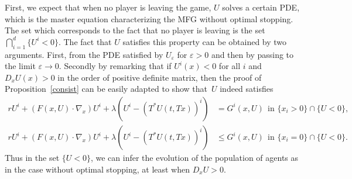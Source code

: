 \documentclass[JEP,XML,SOM,Unicode,NoEqCountersInSection,published]{cedram}
\let\epsilon\varepsilon
\theoremstyle{definition}
\begin{document}
First, we expect that when no player is leaving the game, $U$ solves a certain PDE, which is the master equation characterizing the MFG without optimal stopping. The set which corresponds to the fact that no player is leaving is the set $\bigcap_{i =1}^d \{ U^i < 0\}$. The fact that $U$ satisfies this property can be obtained by two arguments. First, from the PDE satisfied by $U_{\epsilon}$ for $\epsilon > 0$ and then by passing to the limit $\epsilon \to 0$. Secondly by remarking that if $U^i(x) < 0$ for all $i$ and $D_xU(x) > 0$ in the order of positive definite matrix, then the proof of Proposition~\ref{consist} can be easily adapted to show that~$U$ indeed satisfies
\begin{align*}
r U^i+(F(x,U)\cdot \nabla_x)U^i+\lambda \left(U^i-(T^*U(t,Tx))^i\right)&= G^i(x,U) \ \ \text{in } \{x_i > 0\}\cap \{ U < 0 \},
\\
r U^i+(F(x,U)\cdot \nabla_x)U^i+\lambda \left(U^i-(T^*U(t,Tx))^i\right)&\leq G^i(x,U) \ \ \text{in } \{x_i =0\} \cap \{ U < 0\}.
\end{align*}
Thus in the set $\{U < 0\}$, we can infer the evolution of the population of agents as in the case without optimal stopping, at least when $D_x U > 0$.
\end{document}
